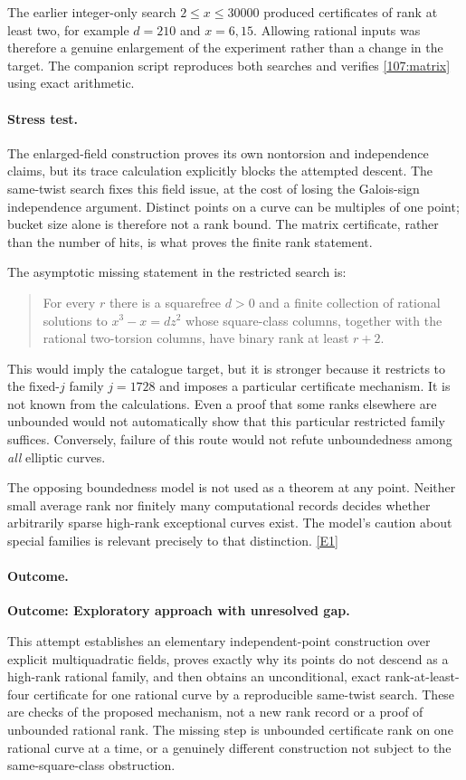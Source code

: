 \documentclass[11pt,a4paper]{article}
\newcommand{\eref}[2]{\hyperlink{extra:#1:#2}{[E#2]}}
\numberwithin{equation}{section}
\begin{document}
The earlier integer-only search $2\leq x\leq30000$ produced certificates of
rank at least two, for example $d=210$ and $x=6,15$. Allowing rational inputs
was therefore a genuine enlargement of the experiment rather than a change
in the target. The companion script reproduces both searches and verifies
\eqref{107:matrix} using exact arithmetic.

\paragraph{Stress test.}
The enlarged-field construction proves its own nontorsion and independence
claims, but its trace calculation explicitly blocks the attempted descent.
The same-twist search fixes this field issue, at the cost of losing the
Galois-sign independence argument. Distinct points on a curve can be
multiples of one point; bucket size alone is therefore not a rank bound.
The matrix certificate, rather than the number of hits, is what proves the
finite rank statement.

The asymptotic missing statement in the restricted search is:
\begin{quote}
For every $r$ there is a squarefree $d>0$ and a finite collection of rational
solutions to $x^3-x=dz^2$ whose square-class columns, together with the
rational two-torsion columns, have binary rank at least $r+2$.
\end{quote}
This would imply the catalogue target, but it is stronger because it restricts
to the fixed-$j$ family $j=1728$ and imposes a particular certificate mechanism.
It is not known from the calculations. Even a proof that some ranks elsewhere
are unbounded would not automatically show that this particular restricted
family suffices. Conversely, failure of this route would not refute
unboundedness among \emph{all} elliptic curves.

The opposing boundedness model is not used as a theorem at any point.
Neither small average rank nor finitely many computational records decides
whether arbitrarily sparse high-rank exceptional curves exist. The model's
caution about special families is relevant precisely to that distinction.
\eref{107}{1}

\paragraph{Outcome.}
\textbf{Outcome: Exploratory approach with unresolved gap.}

This attempt establishes an elementary independent-point construction over
explicit multiquadratic fields, proves exactly why its points do not descend
as a high-rank rational family, and then obtains an unconditional, exact
rank-at-least-four certificate for one rational curve by a reproducible
same-twist search. These are checks of the proposed mechanism, not a new
rank record or a proof of unbounded rational rank. The missing step is
unbounded certificate rank on one rational curve at a time, or a genuinely
different construction not subject to the same-square-class obstruction.
\end{document}
